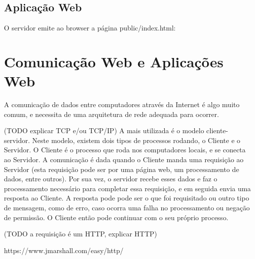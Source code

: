 \documentclass[a4paper,12pt]{article}
\begin{document}



\subsection{Aplicação Web}


O servidor emite ao browser a página public/index.html:







\section{Comunicação Web e Aplicações Web}

A comunicação de dados entre computadores através da Internet é algo muito comum, e necessita de uma arquitetura de rede adequada para ocorrer.

(TODO explicar TCP e/ou TCP/IP)
A mais utilizada é o modelo cliente-servidor. Neste modelo, existem dois tipos de processos rodando, o Cliente e o Servidor. O Cliente é o processo que roda nos computadores locais, e se conecta ao Servidor. A comunicação é dada quando o Cliente manda uma requisição ao Servidor (esta requisição pode ser por uma página web, um processamento de dados, entre outros). Por sua vez, o servidor recebe esses dados e faz o processamento necessário para completar essa requisição, e em seguida envia uma resposta ao Cliente. A resposta pode pode ser o que foi requisitado ou outro tipo de mensagem, como de erro, caso ocorra uma falha no processamento ou negação de permissão. O Cliente então pode continuar com o seu próprio processo.


(TODO a requisição é um HTTP, explicar HTTP)

https://www.jmarshall.com/easy/http/
\end{document}
